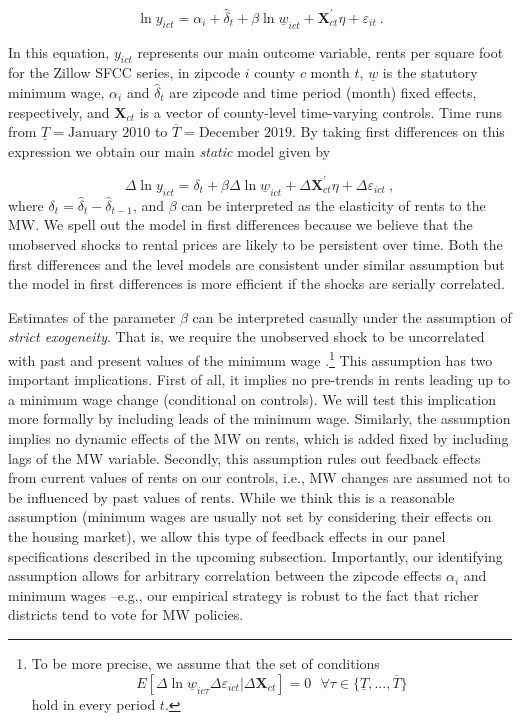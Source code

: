 \begin{equation*} \label{eq:did_lev}
    \ln y_{ict} = \alpha_i + \hat{\delta}_t 
    			+ \beta \ln \underline{w}_{ict}
    			+ \mathbf{X}^{'}_{ct}\eta
    			+ \varepsilon_{it} \ .
\end{equation*}    

In this equation, $y_{ict}$ represents our main outcome variable, rents per square foot 
for the Zillow SFCC series, in zipcode $i$ county $c$ month $t$, $\underline{w}$ is the 
statutory minimum wage, $\alpha_i$ and $\hat{\delta}_t$ are zipcode and time period (month) 
fixed effects, respectively, and $\mathbf{X}_{ct}$ is a vector of county-level time-varying 
controls. Time runs from $\underline{T} = \text{January 2010}$ to $\overline{T} = 
\text{December 2019}$. By taking first differences on this expression we obtain our main 
\textit{static} model given by
    
\begin{equation}\label{eq:did}
	\Delta \ln y_{ict} = \delta_t
						+ \beta \Delta \ln \underline{w}_{ict}
						+ \Delta \mathbf{X}^{'}_{ct} \eta
						+ \Delta \varepsilon_{ict} \ ,
\end{equation}
where $\delta_t = \hat{\delta}_t - \hat{\delta}_{t-1}$, and $\beta$ can be interpreted 
as the elasticity of rents to the MW. We spell out the model in first differences because 
we believe that the unobserved shocks to rental prices are likely to be persistent over 
time. Both the first differences and the level models are consistent under similar assumption 
but the model in first differences is more efficient if the shocks are serially correlated.

Estimates of the parameter $\beta$ can be interpreted casually under the assumption of
\textit{strict exogeneity}. That is, we require the unobserved shock to be uncorrelated
with past and present values of the minimum wage \parencite[][chapter 10]
{wooldridge2010}.\footnote{To be more precise, we assume that the set of conditions 
	$$E[\Delta \ln \underline{w}_{ic\tau} \Delta \varepsilon_{ict} | \Delta \mathbf{X}_{ct}] = 0
	\ \ \ \forall \tau \in \{\underline{T}, ..., \overline{T}\}$$
	hold in every period $t$.}
This assumption has two important implications. First of all, it implies no pre-trends in 
rents leading up to a minimum wage change (conditional on controls). We will test this 
implication more formally by including leads of the minimum wage. Similarly, the assumption 
implies no dynamic effects of the MW on rents, which is added fixed by including lags of the 
MW variable. Secondly, this assumption rules out feedback effects from current values of rents 
on our controls, i.e., MW changes are assumed not to be influenced by past values of rents. 
While we think this is a reasonable assumption (minimum wages are usually not set by considering 
their effects on the housing market), we allow this type of feedback effects in our panel 
specifications described in the upcoming subsection. Importantly, our identifying assumption 
allows for arbitrary correlation between the zipcode effects $\alpha_i$ and minimum wages 
--e.g., our empirical strategy is robust to the fact that richer districts tend to vote for 
MW policies.

